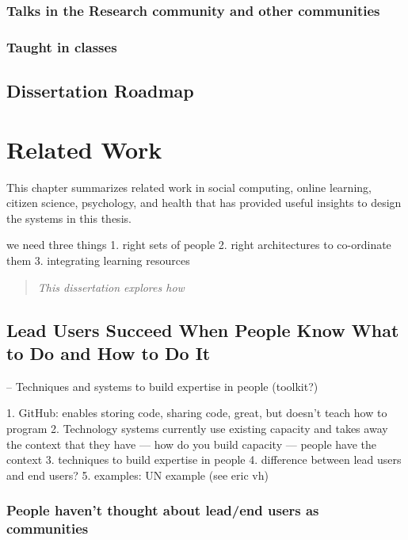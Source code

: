  \subsection{Talks in the Research community and other communities}
 \subsection{Taught in classes}


\section{Dissertation Roadmap}


\chapter{Related Work}
This chapter summarizes related work in social computing, online learning, citizen science, psychology, and health that has provided useful insights to design the systems in this thesis.


we need three things
1. right sets of people
2. right architectures to co-ordinate them
3. integrating learning resources 


\begin{quote}
\emph{This dissertation explores how }

\end{quote}
\vspace{0.25in}

\section{Lead Users Succeed When People Know What to Do and How to Do It}
-- Techniques and systems to build expertise in people (toolkit?)

1. GitHub: enables storing code, sharing code, great, but doesn’t teach how to program
2. Technology systems currently use existing capacity and takes away the context that they have — how do you build capacity — people have the context 
3. techniques to build expertise in people
4. difference between lead users and end users? 
5. examples: UN example (see eric vh)

\subsection{People haven't thought about lead/end users as communities}

